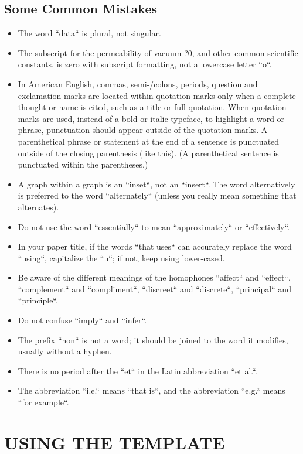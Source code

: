 \documentclass[letterpaper, 10 pt, conference]{ieeeconf}
\begin{document}
\subsection{Some Common Mistakes}
\begin{itemize}


\item The word ``data`` is plural, not singular.
\item The subscript for the permeability of vacuum ?0, and other common scientific constants, is zero with subscript formatting, not a lowercase letter ``o``.
\item In American English, commas, semi-/colons, periods, question and exclamation marks are located within quotation marks only when a complete thought or name is cited, such as a title or full quotation. When quotation marks are used, instead of a bold or italic typeface, to highlight a word or phrase, punctuation should appear outside of the quotation marks. A parenthetical phrase or statement at the end of a sentence is punctuated outside of the closing parenthesis (like this). (A parenthetical sentence is punctuated within the parentheses.)
\item A graph within a graph is an ``inset``, not an ``insert``. The word alternatively is preferred to the word ``alternately`` (unless you really mean something that alternates).
\item Do not use the word ``essentially`` to mean ``approximately`` or ``effectively``.
\item In your paper title, if the words ``that uses`` can accurately replace the word ``using``, capitalize the ``u``; if not, keep using lower-cased.
\item Be aware of the different meanings of the homophones ``affect`` and ``effect``, ``complement`` and ``compliment``, ``discreet`` and ``discrete``, ``principal`` and ``principle``.
\item Do not confuse ``imply`` and ``infer``.
\item The prefix ``non`` is not a word; it should be joined to the word it modifies, usually without a hyphen.
\item There is no period after the ``et`` in the Latin abbreviation ``et al.``.
\item The abbreviation ``i.e.`` means ``that is``, and the abbreviation ``e.g.`` means ``for example``.

\end{itemize}


\section{USING THE TEMPLATE}
\end{document}
